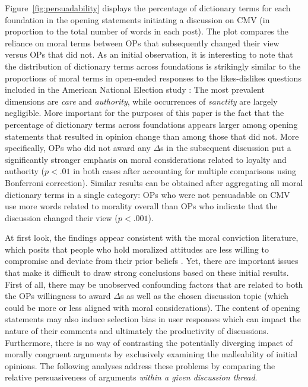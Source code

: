 Figure~\ref{fig:persuadability} displays the percentage of dictionary terms for each foundation in the opening statements initiating a discussion on CMV (in proportion to the total number of words in each post). The plot compares the reliance on moral terms between OPs that subsequently changed their view versus OPs that did not. As an initial observation, it is interesting to note that the distribution of dictionary terms across foundations is strikingly similar to the proportions of moral terms in open-ended responses to the likes-dislikes questions included in the American National Election study \citep[c.f.,][]{kraft2018measuring}: The most prevalent dimensions are \textit{care} and \textit{authority}, while occurrences of \textit{sanctity} are largely negligible. More important for the purposes of this paper is the fact that the percentage of dictionary terms across foundations appears larger among opening statements that resulted in opinion change than among those that did not. More specifically, OPs who did not award any $\Delta$s in the subsequent discussion put a significantly stronger emphasis on moral considerations related to loyalty and authority ($p<.01$ in both cases after accounting for multiple comparisons using Bonferroni correction). Similar results can be obtained after aggregating all moral dictionary terms in a single category: OPs who were not persuadable on CMV use more words related to morality overall than OPs who indicate that the discussion changed their view ($p<.001$).

At first look, the findings appear consistent with the moral conviction literature, which posits that people who hold moralized attitudes are less willing to compromise and deviate from their prior beliefs \citep[e.g.,][]{skitka2005moral,ryan2014reconsidering,ryan2017no}. Yet, there are important issues that make it difficult to draw strong conclusions based on these initial results. First of all, there may be unobserved confounding factors that are related to both the OPs willingness to award $\Delta$s as well as the chosen discussion topic (which could be more or less aligned with moral considerations). The content of opening statements may also induce selection bias in user responses which can impact the nature of their comments and ultimately the productivity of discussions. Furthermore, there is no way of contrasting the potentially diverging impact of morally congruent arguments by exclusively examining the malleability of initial opinions. The following analyses address these problems by comparing the relative persuasiveness of arguments \textit{within a given discussion thread}.



